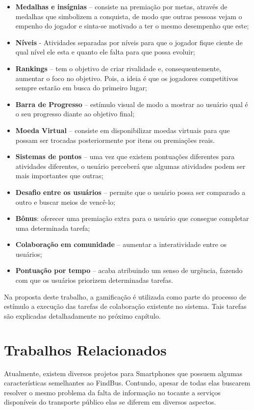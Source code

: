 \begin{itemize}
\item \textbf{Medalhas e insígnias} – consiste na premiação por metas, através de medalhas que simbolizem a conquista, de modo que outras pessoas vejam o empenho do jogador e sinta-se motivado a ter o mesmo desempenho que este;
\item \textbf{Níveis} -  Atividades separadas por níveis para que o jogador fique ciente de qual nível ele esta e quanto ele falta para que possa evoluir;
\item \textbf{Rankings} – tem o objetivo de criar rivalidade e, consequentemente, aumentar o foco no objetivo. Pois, a ideia é que os jogadores competitivos sempre estarão em busca do primeiro lugar;
\item \textbf{Barra de Progresso} – estímulo visual de modo a mostrar ao usuário qual é o seu progresso diante ao objetivo final;
\item \textbf{Moeda Virtual} – consiste em disponibilizar moedas virtuais para que possam ser trocadas posteriormente por itens ou premiações reais.
\item \textbf{Sistemas de pontos} – uma vez que existem pontuações diferentes para atividades diferentes, o usuário perceberá que algumas atividades podem ser mais importantes que outras;
\item \textbf{Desafio entre os usuários} – permite que o usuário possa ser comparado a outro e buscar meios de vencê-lo;
\item \textbf{Bônus}: oferecer uma premiação extra para o usuário que consegue completar uma determinada tarefa;
\item \textbf{Colaboração em comunidade} – aumentar a interatividade entre os usuários;
\item \textbf{Pontuação por tempo} – acaba atribuindo um senso de urgência, fazendo com que os usuários priorizem determinadas tarefas.
\end{itemize}

Na proposta deste trabalho, a gamificação é utilizada como parte do processo de estímulo  a execução das tarefas de colaboração existente no sistema. Tais tarefas são explicadas detalhadamente no próximo capítulo.


\chapter{Trabalhos Relacionados}
\label{ch:trabalhosRelacionados}

Atualmente, existem diversos projetos para Smartphones que possuem algumas características semelhantes ao FindBus. Contundo, apesar de todas elas buscarem resolver o mesmo problema da falta de informação no tocante a serviços disponíveis do transporte público elas se diferem em diversos aspectos. 
	
